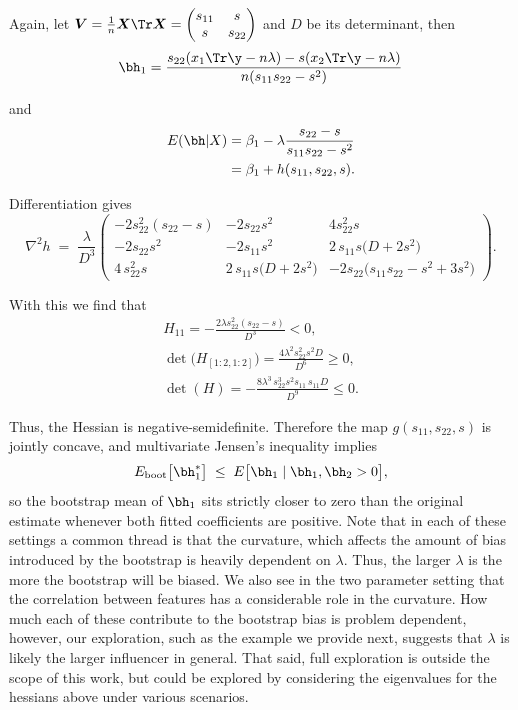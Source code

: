 \noindent Again, let $\boldsymbol{V} = \frac{1}{n}\boldsymbol{X}\Tr\boldsymbol{X} = \begin{pmatrix} s_{11} & s \\ s & s_{22} \end{pmatrix}$ and $D$ be its determinant, then
$$
\begin{aligned}
\bh_1 = \frac{s_{22}(x_1\Tr \y- n\lambda) - s(x_2\Tr \y- n\lambda)}{n(s_{11}s_{22} - s^2)}
\end{aligned}
$$

\noindent and
$$
\begin{aligned}
E(\bh|X) &= \beta_1 - \lambda\frac{s_{22} - s}{s_{11}s_{22} - s^2} \\
&= \beta_1 + h(s_{11}, s_{22}, s).
\end{aligned}
$$

\noindent Differentiation gives
$$
\nabla^{2}h \;=\; \frac{\lambda}{D^{3}}
\begin{pmatrix}
-2s_{22}^{2}(s_{22}-s) & -2s_{22}s^{2} & 4s_{22}^{2}s\\[6pt]
-2s_{22}s^{2} & -2s_{11}s^{2} & 2\,s_{11}s\bigl(D+2s^{2}\bigr)\\[6pt]
4\,s_{22}^{2}s & 2\,s_{11}s\bigl(D+2s^{2}\bigr) & -2s_{22}\bigl(s_{11}s_{22}-s^{2}+3s^{2}\bigr)
\end{pmatrix}.
$$

\noindent With this we find that
$$
\begin{aligned}
H_{11} = -\frac{2\lambda s_{22}^{2}(s_{22}-s)}{D^{3}} < 0, \\ 
\det\bigl(H_{[1:2,1:2]}\bigr) = \frac{4\lambda^{2}s_{22}^{2}s^{2}D}{D^{6}} \geq 0, \\
\det(H) = -\frac{8\lambda^{3}\,s_{22}^{3}s^{2}s_{11}\,s_{11}D}{D^{9}} \leq 0.
\end{aligned}
$$

\noindent Thus, the Hessian is negative-semidefinite.  Therefore the map $g(s_{11},s_{22},s)$ is jointly concave, and multivariate Jensen's inequality implies
$$
E_{\text{boot}}\bigl[\bh_{1}^{*}\bigr]
  \;\le\; E\bigl[\bh_{1}\mid \bh_1, \bh_2 > 0 \bigr],
$$
so the bootstrap mean of $\bh_{1}$ sits strictly closer to zero than the original estimate whenever both fitted coefficients are positive. Note that in each of these settings a common thread is that the curvature, which affects the amount of bias introduced by the bootstrap is heavily dependent on $\lambda$. Thus, the larger $\lambda$ is the more the bootstrap will be biased. We also see in the two parameter setting that the correlation between features has a considerable role in the curvature. How much each of these contribute to the bootstrap bias is problem dependent, however, our exploration, such as the example we provide next, suggests that $\lambda$ is likely the larger influencer in general. That said, full exploration is outside the scope of this work, but could be explored by considering the eigenvalues for the hessians above under various scenarios.

